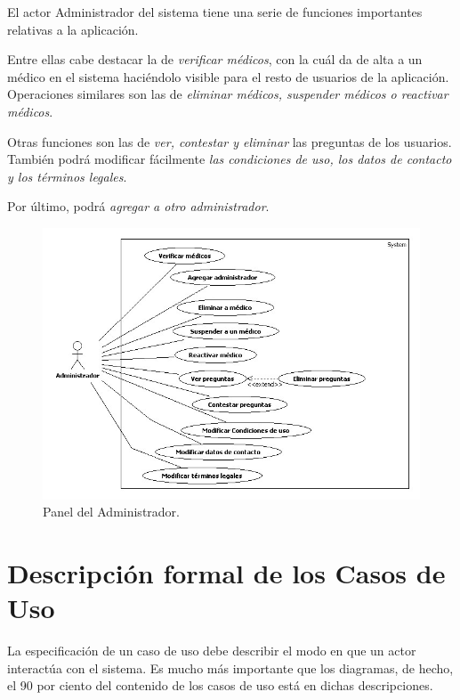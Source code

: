 \documentclass[a4paper,oneside,11pt]{book}
\begin{document}
			El actor Administrador del sistema tiene una serie de funciones importantes relativas a la aplicación. 
			
			Entre ellas cabe destacar la de \textit{verificar médicos}, con la cuál da de alta a un médico en el sistema haciéndolo visible para el resto de usuarios de la aplicación. Operaciones similares son las de \textit{eliminar médicos, suspender médicos o reactivar médicos}. 
			
			Otras funciones son las de \textit{ver, contestar y eliminar} las preguntas de los usuarios. También podrá modificar fácilmente \textit{las condiciones de uso, los datos de contacto y los términos legales}. 
			
			Por último, podrá \textit{agregar a otro administrador}.
			
			\begin{figure}[H]
			  \centering
			    \includegraphics[width=15cm]{img/jpg/casos_uso/Panel_de_Administrador.jpg}
			  \caption{Panel del Administrador.}
			  \label{fig:panel_admin}
			\end{figure}
					
	
	\newpage
	\section{Descripción formal de los Casos de Uso} %
	\label{sub:descripcion_formal_de_los_casos_de_uso}
		
		La especificación de un caso de uso debe describir el modo en que un actor interactúa con el sistema. Es mucho más importante que los diagramas, de hecho, el 90 por ciento del contenido de los casos de uso está en dichas descripciones.
			
\end{document}
